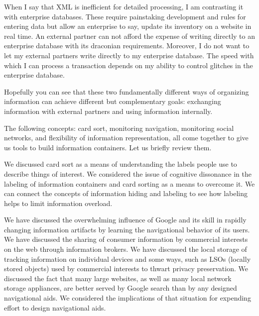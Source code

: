 When I say that XML is inefficient for detailed processing, I am
contrasting it with enterprise databases. These require painstaking
development and rules for entering data but allow an enterprise to say,
update its inventory on a website in real time. An external partner can
not afford the expense of writing directly to an enterprise database
with its draconian requirements. Moreover, I do not want to let my
external partners write directly to my enterprise database. The speed
with which I can process a transaction depends on my ability to control
glitches in the enterprise database.

Hopefully you can see that these two fundamentally different ways of
organizing information can achieve different but complementary goals:
exchanging information with external partners and using information
internally.

\hypertarget{connecting-concepts}{%
\label{connecting-concepts}}

The following concepts: card sort, monitoring navigation, monitoring
social networks, and flexibility of information representation, all come
together to give us tools to build information containers. Let us
briefly review them.

\hypertarget{understanding-labels}{%
\label{understanding-labels}}

We discussed card sort as a means of understanding the labels people use
to describe things of interest. We considered the issue of cognitive
dissonance in the labeling of information containers and card sorting as
a means to overcome it. We can connect the concepts of information
hiding and labeling to see how labeling helps to limit information
overload.

\hypertarget{learning-navigational-behavior}{%
\label{learning-navigational-behavior}}

We have discussed the overwhelming influence of Google and its skill in
rapidly changing information artifacts by learning the navigational
behavior of its users. We have discussed the sharing of consumer
information by commercial interests on the web through information
brokers. We have discussed the local storage of tracking information on
individual devices and some ways, such as LSOs (locally stored objects)
used by commercial interests to thwart privacy preservation. We
discussed the fact that many large websites, as well as many local
network storage appliances, are better served by Google search than by
any designed navigational aids. We considered the implications of that
situation for expending effort to design navigational aids.

